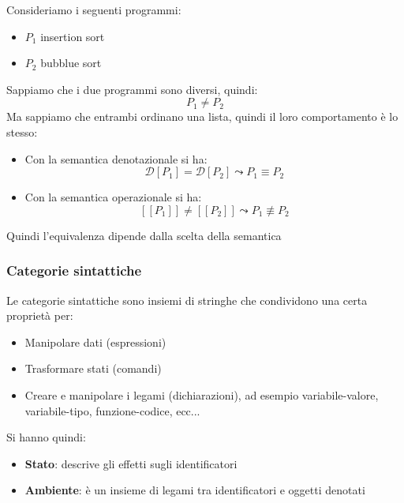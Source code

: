 \documentclass[a4paper]{article}
\begin{document}
\begin{example}
  Consideriamo i seguenti programmi:
  \begin{itemize}
    \item \( P_1 \) insertion sort
    \item \( P_2 \) bubblue sort
  \end{itemize}
  Sappiamo che i due programmi sono diversi, quindi:
  \[
    P_1 \neq P_2
  \] 
  Ma sappiamo che entrambi ordinano una lista, quindi il loro comportamento è lo stesso:
  \begin{itemize}
    \item Con la semantica denotazionale si ha:
      \[
        \mathcal{D}[P_1] = \mathcal{D}[P_2] \leadsto P_1 \equiv P_2
      \] 

    \item Con la semantica operazionale si ha:
      \[
        [\![ P_1 ]\!] \neq [\![ P_2 ]\!] \leadsto P_1 \not\equiv P_2
      \] 
  \end{itemize}
  Quindi l'equivalenza dipende dalla scelta della semantica
\end{example}

\subsubsection{Categorie sintattiche}
Le categorie sintattiche sono insiemi di stringhe che condividono una certa proprietà
per:
\begin{itemize}
  \item Manipolare dati (espressioni)
  \item Trasformare stati (comandi)
  \item Creare e manipolare i legami (dichiarazioni), ad esempio variabile-valore,
    variabile-tipo, funzione-codice, ecc...
\end{itemize}
Si hanno quindi:
\begin{itemize}
  \item \textbf{Stato}: descrive gli effetti sugli identificatori
  \item \textbf{Ambiente}: è un insieme di legami tra identificatori e oggetti
    denotati
\end{itemize}
\end{document}
